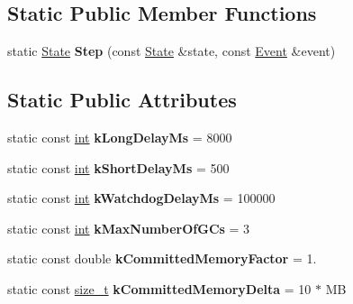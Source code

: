 \subsection*{Static Public Member Functions}
\begin{DoxyCompactItemize}
\item 
\mbox{\label{classv8_1_1internal_1_1MemoryReducer_acb773a2429f9006c75dda44558b28250}} 
static \mbox{\hyperlink{structv8_1_1internal_1_1MemoryReducer_1_1State}{State}} {\bfseries Step} (const \mbox{\hyperlink{structv8_1_1internal_1_1MemoryReducer_1_1State}{State}} \&state, const \mbox{\hyperlink{structv8_1_1internal_1_1MemoryReducer_1_1Event}{Event}} \&event)
\end{DoxyCompactItemize}
\subsection*{Static Public Attributes}
\begin{DoxyCompactItemize}
\item 
\mbox{\label{classv8_1_1internal_1_1MemoryReducer_a9560a6e073f69b8bbb7f3f91025405e9}} 
static const \mbox{\hyperlink{classint}{int}} {\bfseries k\+Long\+Delay\+Ms} = 8000
\item 
\mbox{\label{classv8_1_1internal_1_1MemoryReducer_ab7e2131ef74777b24fdf47f2a0f1c925}} 
static const \mbox{\hyperlink{classint}{int}} {\bfseries k\+Short\+Delay\+Ms} = 500
\item 
\mbox{\label{classv8_1_1internal_1_1MemoryReducer_aea8eec9cb70717cff5db71c98545dc22}} 
static const \mbox{\hyperlink{classint}{int}} {\bfseries k\+Watchdog\+Delay\+Ms} = 100000
\item 
\mbox{\label{classv8_1_1internal_1_1MemoryReducer_aed193ce51a1f1f504c51869abe024b7b}} 
static const \mbox{\hyperlink{classint}{int}} {\bfseries k\+Max\+Number\+Of\+G\+Cs} = 3
\item 
\mbox{\label{classv8_1_1internal_1_1MemoryReducer_a4f3d452e0ed4ba216d104a47908ee815}} 
static const double {\bfseries k\+Committed\+Memory\+Factor} = 1.
\item 
\mbox{\label{classv8_1_1internal_1_1MemoryReducer_a6558d1f96e8713f098912eb4139356cb}} 
static const \mbox{\hyperlink{classsize__t}{size\+\_\+t}} {\bfseries k\+Committed\+Memory\+Delta} = 10 $\ast$ MB
\end{DoxyCompactItemize}
